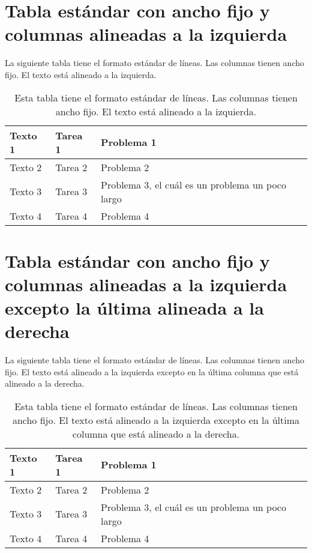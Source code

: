 \section*{Tabla estándar con ancho fijo y columnas alineadas a la izquierda}

La siguiente tabla tiene el formato estándar de líneas. Las columnas tienen ancho fijo. El texto está alineado a la izquierda.

\begin{table}[h]
	\centering
	\begin{tabular}{|>{\raggedright\arraybackslash}p{2cm}|>{\raggedright\arraybackslash}p{2.5cm}|>{\raggedright\arraybackslash}p{5cm}|}
		\hline
		Texto 1 & Tarea 1 & Problema 1 \\
		\hline
		Texto 2 & Tarea 2 & Problema 2 \\
		\hline
		Texto 3 & Tarea 3 & Problema 3, el cuál es un problema un poco largo \\
		\hline
		Texto 4 & Tarea 4 & Problema 4 \\
		\hline
	\end{tabular}
	\caption[Tabla estándar con ancho fijo y columnas alineadas a la izquierda]{Esta tabla tiene el formato estándar de líneas. Las columnas tienen ancho fijo. El texto está alineado a la izquierda.}
	\label{table5}
\end{table}

\section*{Tabla estándar con ancho fijo y columnas alineadas a la izquierda excepto la última alineada a la derecha}

La siguiente tabla tiene el formato estándar de líneas. Las columnas tienen ancho fijo. El texto está alineado a la izquierda excepto en la última columna que está alineado a la derecha.

\begin{table}[h]
	\centering
	\begin{tabular}{|>{\raggedright\arraybackslash}p{2cm}|>{\raggedright\arraybackslash}p{2.5cm}|>{\raggedleft\arraybackslash}p{5cm}|}
		\hline
		Texto 1 & Tarea 1 & Problema 1 \\
		\hline
		Texto 2 & Tarea 2 & Problema 2 \\
		\hline
		Texto 3 & Tarea 3 & Problema 3, el cuál es un problema un poco largo \\
		\hline
		Texto 4 & Tarea 4 & Problema 4 \\
		\hline
	\end{tabular}
	\caption[Tabla estándar con ancho fijo y columnas alineadas a la izquierda excepto la última alineada a la derecha]{Esta tabla tiene el formato estándar de líneas. Las columnas tienen ancho fijo. El texto está alineado a la izquierda excepto en la última columna que está alineado a la derecha.}
	\label{table6}
\end{table}

